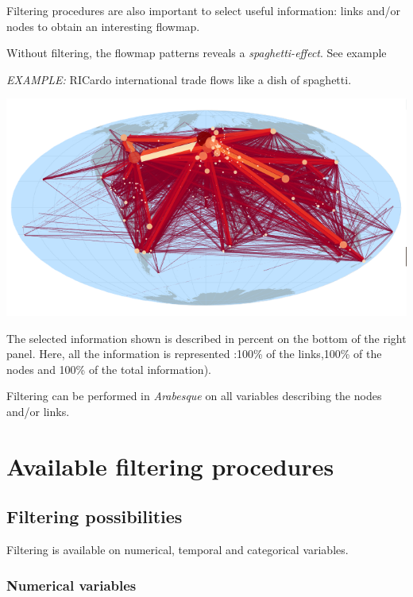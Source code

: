 \documentclass[
  letterpaper,
  DIV=11,
  numbers=noendperiod]{scrreprt}
\begin{document}
Filtering procedures are also important to select useful information:
links and/or nodes to obtain an interesting flowmap.

Without filtering, the flowmap patterns reveals a
\emph{spaghetti-effect}. See example

\emph{EXAMPLE:} RICardo international trade flows like a dish of
spaghetti.

\begin{center}
\includegraphics{images/RICardo_spaghetti.png}
\end{center}

The selected information shown is described in percent on the bottom of
the right panel. Here, all the information is represented :100\% of the
links,100\% of the nodes and 100\% of the total information).

Filtering can be performed in \emph{Arabesque} on all variables
describing the nodes and/or links.

\section{Available filtering
procedures}\label{available-filtering-procedures}

\subsection{Filtering possibilities}\label{filtering-possibilities}

Filtering is available on numerical, temporal and categorical variables.

\subsubsection{Numerical variables}\label{numerical-variables}
\end{document}
